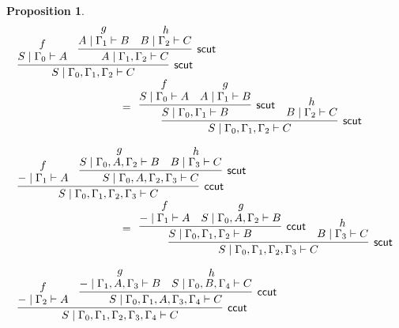 \documentclass[sn-mathphys-num]{sn-jnl}%
\newcommand{\GG}{\Gamma}
\newcommand{\vd}{\vdash}
\newcommand{\mf}[1]{\mathsf{#1}}
\theoremstyle{thmstyleone}%
\newtheorem{proposition}[theorem]{Proposition}%
\theoremstyle{thmstyletwo}%
\theoremstyle{thmstylethree}%
\begin{document}
\begin{proposition}
\begin{displaymath}
      \begin{array}{l}
      \begin{array}{c}
        \infer[\mf{scut}]{S \mid \GG_0 , \GG_1 , \GG_2 \vd C}{
          \deduce{S \mid \GG_0 \vd A}{f}
          &
          \infer[\mf{scut}]{A \mid \GG_1 , \GG_2 \vd C}{
            \deduce{A \mid \GG_1 \vd B}{g}
            &
            \deduce{B \mid \GG_2 \vd C}{h}
          }
        }
      \end{array}
      \\[10pt]
      \qquad \qquad \qquad \qquad \qquad  =
      \begin{array}{c}
        \infer[\mf{scut}]{S \mid \GG_0 , \GG_1 , \GG_2 \vd C}{
          \infer[\mf{scut}]{S \mid \GG_0 , \GG_1 \vd B}{
            \deduce{S \mid \GG_0 \vd A}{f}
            &
            \deduce{A \mid \GG_1 \vd B}{g}
          }
          &
          \deduce{B \mid \GG_2 \vd C}{h}
        }
      \end{array}
      \\[30pt]
      \begin{array}{c}
        \infer[\mf{ccut}]{S \mid \GG_0 , \GG_1 , \GG_2 , \GG_3 \vd C}{
          \deduce{{-} \mid \GG_1 \vd A}{f}
          &
          \infer[\mf{scut}]{S \mid \GG_0 , A , \GG_2 , \GG_3 \vd C}{
            \deduce{S \mid \GG_0 , A , \GG_2 \vd B}{g}
            &
            \deduce{B \mid \GG_3 \vd C}{h}
          }
        }
      \end{array}
      \\[10pt]
      \qquad \qquad \qquad \qquad \qquad  =
      \begin{array}{c}
        \infer[\mf{scut}]{S \mid \GG_0 , \GG_1 , \GG_2 , \GG_3 \vd C}{
          \infer[\mf{ccut}]{S \mid \GG_0 , \GG_1 , \GG_2 \vd B}{
            \deduce{{-} \mid \GG_1 \vd A}{f}
            &
            \deduce{S \mid \GG_0 , A , \GG_2 \vd B}{g}
          }
          &
          \deduce{B \mid \GG_3 \vd C}{h}
        }
      \end{array}
      \\[30pt]
      \begin{array}{c}
        \infer[\mf{ccut}]{S \mid \GG_0 , \GG_1 , \GG_2 , \GG_3 , \GG_4 \vd C}{
          \deduce{{-} \mid \GG_2 \vd A}{f}
          &
          \infer[\mf{ccut}]{S \mid \GG_0 , \GG_1 , A , \GG_3 , \GG_4 \vd C}{
            \deduce{{-} \mid \GG_1 , A , \GG_3 \vd B}{g}
            &
            \deduce{S \mid \GG_0 , B , \GG_4 \vd C}{h}
          }
        }
      \end{array}

\end{array}
\end{displaymath}
\end{proposition}
\end{document}
